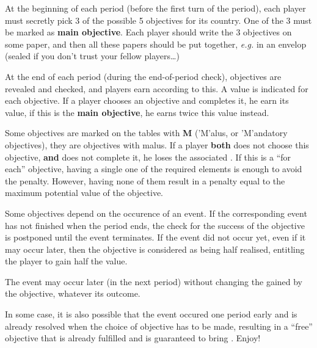 \bparag At the beginning of each period (before the first turn of the
period), each player must secretly pick 3 of the possible 5 objectives
for its country.
\bparag One of the 3 must be marked as \textbf{main objective}.
\bparag Each player should write the 3 objectives on some paper, and then all
these papers should be put together, \emph{e.g.} in an envelop (sealed if you
don't trust your fellow players\ldots)

\bparag At the end of each period (during the end-of-period \VPs check),
objectives are revealed and checked, and players earn \VPs according to
this.
\bparag A \VPs value is indicated for each objective. If a player
chooses an objective and completes it, he earn its \VPs value, if this
is the \textbf{main objective}, he earns twice this value instead.

\bparag Some objectives are marked on the tables with {\bf M} ('M'alus, or
'M'andatory objectives), they are objectives with malus.
\bparag If a player \textbf{both} does not choose this objective, \textbf{and}
does not complete it, he loses the associated \VPs.
\bparag If this is a ``for each'' objective, having a single one of the
required elements is enough to avoid the penalty. However, having none
of them result in a penalty equal to the maximum potential value of the
objective.


\bparag Some objectives depend on the occurence of an event.
\bparag If the corresponding event has not finished %
when the period ends, the check for the success of the objective is
postponed until the event %
terminates.
\bparag If the event did not occur yet, even if it may occur later, then
the objective is considered as being half realised, entitling the player
to gain half the \VPs value.

\begin{designnote}
  The event may occur later (in the next period) without changing the
  \VPs gained by the objective, whatever its outcome.

  In some case, it is also possible that the event occured one period
  early and is already resolved when the choice of objective has to be
  made, resulting in a ``free'' objective that is already fulfilled and
  is guaranteed to bring \VPs. Enjoy!
\end{designnote}

